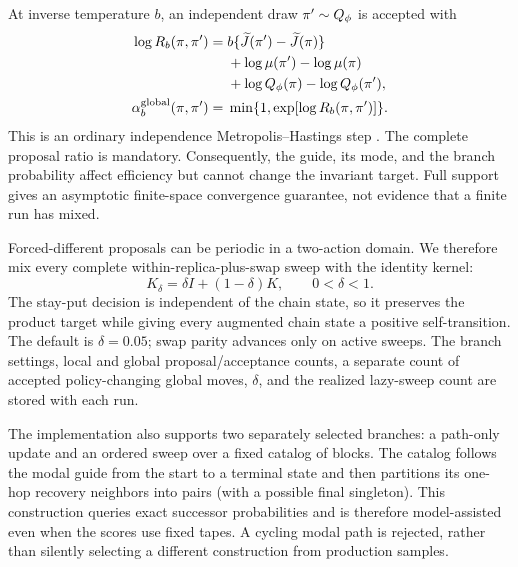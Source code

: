 At inverse temperature \(b\), an independent draw
\(\pi'\sim Q_\phi\) is accepted with
\begin{align}
  \log R_b(\pi,\pi')={}&
      b\{\widetilde J(\pi')-\widetilde J(\pi)\}
      \notag\\
    &+\log\mu(\pi')-\log\mu(\pi)
      \notag\\
    &+\log Q_\phi(\pi)-\log Q_\phi(\pi'),
      \label{eq:global-policy-log-ratio}\\
  \alpha_b^{\mathrm{global}}(\pi,\pi')={}&
      \min\{1,\exp[\log R_b(\pi,\pi')]\}.
  \label{eq:global-policy-mh}
\end{align}
This is an ordinary independence Metropolis--Hastings step
\citep{mengersenTweedie1996}.  The complete proposal ratio is mandatory.
Consequently, the guide, its mode, and the branch probability affect efficiency
but cannot change the invariant target.  Full support gives an asymptotic
finite-space convergence guarantee, not evidence that a finite run has mixed.

Forced-different proposals can be periodic in a two-action domain.  We therefore
mix every complete within-replica-plus-swap sweep with the identity kernel:
\begin{equation}
  K_\delta=\delta I+(1-\delta)K, \qquad 0<\delta<1.
  \label{eq:lazy-sweep}
\end{equation}
The stay-put decision is independent of the chain state, so it preserves the
product target while giving every augmented chain state a positive self-transition.
The default is \(\delta=0.05\); swap parity advances only on active sweeps.
The branch settings, local and global proposal/acceptance counts, a separate
count of accepted policy-changing global moves, \(\delta\), and the realized
lazy-sweep count are stored with each run.


The implementation also supports two separately selected branches: a
path-only update and an ordered sweep over a fixed catalog of blocks.
The catalog follows the modal guide from the start to a terminal state and
then partitions its one-hop recovery neighbors into pairs (with a possible
final singleton). This construction queries exact successor probabilities
and is therefore model-assisted even when the scores use fixed tapes.
A cycling modal path is rejected, rather than silently selecting a different
construction from production samples.

